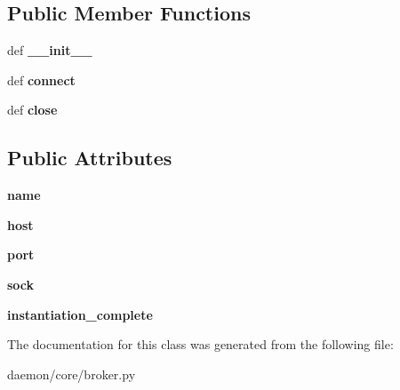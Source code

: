 \subsection*{Public Member Functions}
\begin{DoxyCompactItemize}
\item 
\hypertarget{classcore_1_1broker_1_1_core_server_ada998dc57c1bfdfdf81234e56cade92c}{def {\bfseries \+\_\+\+\_\+init\+\_\+\+\_\+}}\label{classcore_1_1broker_1_1_core_server_ada998dc57c1bfdfdf81234e56cade92c}

\item 
\hypertarget{classcore_1_1broker_1_1_core_server_a4349b4222f7b03a79d8d24fc564b2357}{def {\bfseries connect}}\label{classcore_1_1broker_1_1_core_server_a4349b4222f7b03a79d8d24fc564b2357}

\item 
\hypertarget{classcore_1_1broker_1_1_core_server_af3208ba5e567a174ccb0d27e9e3e17c0}{def {\bfseries close}}\label{classcore_1_1broker_1_1_core_server_af3208ba5e567a174ccb0d27e9e3e17c0}

\end{DoxyCompactItemize}
\subsection*{Public Attributes}
\begin{DoxyCompactItemize}
\item 
\hypertarget{classcore_1_1broker_1_1_core_server_aae015a5685b70963dccbe27b12cc08a6}{{\bfseries name}}\label{classcore_1_1broker_1_1_core_server_aae015a5685b70963dccbe27b12cc08a6}

\item 
\hypertarget{classcore_1_1broker_1_1_core_server_a3b074955a1947a246cf95b584d2fc7b0}{{\bfseries host}}\label{classcore_1_1broker_1_1_core_server_a3b074955a1947a246cf95b584d2fc7b0}

\item 
\hypertarget{classcore_1_1broker_1_1_core_server_a4e8b8821d22ae08eb8c83f416b1a4860}{{\bfseries port}}\label{classcore_1_1broker_1_1_core_server_a4e8b8821d22ae08eb8c83f416b1a4860}

\item 
\hypertarget{classcore_1_1broker_1_1_core_server_aedaf011afb20ec5760188329f2e60a3e}{{\bfseries sock}}\label{classcore_1_1broker_1_1_core_server_aedaf011afb20ec5760188329f2e60a3e}

\item 
\hypertarget{classcore_1_1broker_1_1_core_server_a4af7cd5b0cabaf6620c4a1e08061364c}{{\bfseries instantiation\+\_\+complete}}\label{classcore_1_1broker_1_1_core_server_a4af7cd5b0cabaf6620c4a1e08061364c}

\end{DoxyCompactItemize}


The documentation for this class was generated from the following file\+:\begin{DoxyCompactItemize}
\item 
daemon/core/broker.\+py\end{DoxyCompactItemize}
